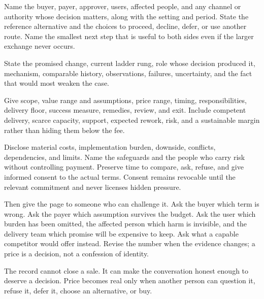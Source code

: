 \begin{description}[leftmargin=2.5em,style=nextline,itemsep=0.3em]
\item[Decision] Name the buyer, payer, approver, users, affected people, and any
  channel or authority whose decision matters, along with the setting and
  period. State the reference alternative and the choices to proceed, decline,
  defer, or use another route. Name the smallest next step that is useful to
  both sides even if the larger exchange never occurs.
\item[Evidence step] State the promised change, current ladder rung, role whose
  decision produced it, mechanism, comparable history, observations, failures,
  uncertainty, and the fact that would most weaken the case.
\item[Commercial terms] Give scope, value range and assumptions, price range,
  timing, responsibilities, delivery floor, success measure, remedies, review,
  and exit. Include competent delivery, scarce capacity, support, expected
  rework, risk, and a sustainable margin rather than hiding them below the fee.
\item[Consent and duties] Disclose material costs, implementation burden,
  downside, conflicts, dependencies, and limits. Name the safeguards and the
  people who carry risk without controlling payment. Preserve time to compare,
  ask, refuse, and give informed consent to the actual terms. Consent remains
  revocable until the relevant commitment and never licenses hidden pressure.
\end{description}

Then give the page to someone who can challenge it. Ask the buyer which term is
wrong. Ask the payer which assumption survives the budget. Ask the user which
burden has been omitted, the affected person which harm is invisible, and the
delivery team which promise will be expensive to keep. Ask what a capable
competitor would offer instead. Revise the number when the evidence changes; a
price is a decision, not a confession of identity.

The record cannot close a sale. It can make the conversation honest enough to
deserve a decision. Price becomes real only when another person can question
it, refuse it, defer it, choose an alternative, or buy.
